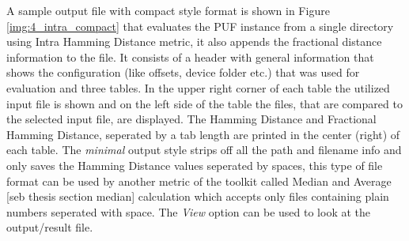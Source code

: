 A sample output file with compact style format is shown in Figure \ref{img:4_intra_compact} that evaluates the PUF instance from a single directory using Intra Hamming Distance metric, it also appends the fractional distance information to the file. It consists of a header with general information that shows the configuration (like offsets, device folder etc.) that was used for evaluation and three tables. In the upper right corner of each table the utilized input file is shown and on the left side of the table
the files, that are compared to the selected input file, are displayed. The Hamming Distance and Fractional Hamming Distance, seperated by a tab length are printed in the center (right) of each table. The
\emph{minimal} output style strips off all the path and filename info and only saves the Hamming Distance values seperated by spaces, this type of file format can be used by another metric of the toolkit called Median and Average [seb thesis section median] calculation which accepts only files containing plain numbers seperated with space. The \emph{View} option can be used to look at the output/result file.\\

